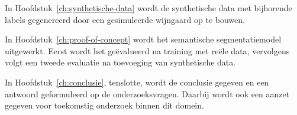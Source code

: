 
In Hoofdstuk~\ref{ch:synthetische-data} wordt de synthetische data met bijhorende labels gegenereerd door een gesimuleerde wijngaard op te bouwen.

In Hoofdstuk~\ref{ch:proof-of-concept} wordt het semantische segmentatiemodel uitgewerkt. Eerst wordt het geëvalueerd na training met reële data, vervolgens volgt een tweede evaluatie na toevoeging van synthetische data.

In Hoofdstuk~\ref{ch:conclusie}, tenslotte, wordt de conclusie gegeven en een antwoord geformuleerd op de onderzoeksvragen. Daarbij wordt ook een aanzet gegeven voor toekomstig onderzoek binnen dit domein.